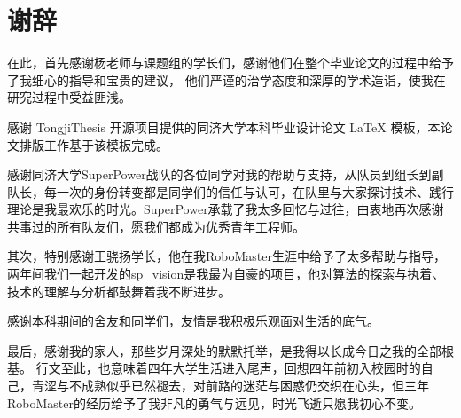 \chapter*{谢\hspace{0.5em}辞}

在此，首先感谢杨老师与课题组的学长们，感谢他们在整个毕业论文的过程中给予了我细心的指导和宝贵的建议，
他们严谨的治学态度和深厚的学术造诣，使我在研究过程中受益匪浅。

感谢 TongjiThesis 开源项目提供的同济大学本科毕业设计论文 \LaTeX{} 模板，本论文排版工作基于该模板完成。

感谢同济大学SuperPower战队的各位同学对我的帮助与支持，从队员到组长到副队长，每一次的身份转变都是同学们的信任与认可，在队里与大家探讨技术、践行理论是我最欢乐的时光。SuperPower承载了我太多回忆与过往，由衷地再次感谢共事过的所有队友们，愿我们都成为优秀青年工程师。

其次，特别感谢王骁扬学长，他在我RoboMaster生涯中给予了太多帮助与指导，两年间我们一起开发的sp\_vision是我最为自豪的项目，他对算法的探索与执着、技术的理解与分析都鼓舞着我不断进步。

感谢本科期间的舍友和同学们，友情是我积极乐观面对生活的底气。

最后，感谢我的家人，那些岁月深处的默默托举，是我得以长成今日之我的全部根基。
行文至此，也意味着四年大学生活进入尾声，回想四年前初入校园时的自己，青涩与不成熟似乎已然褪去，对前路的迷茫与困惑仍交织在心头，但三年RoboMaster的经历给予了我非凡的勇气与远见，时光飞逝只愿我初心不变。

